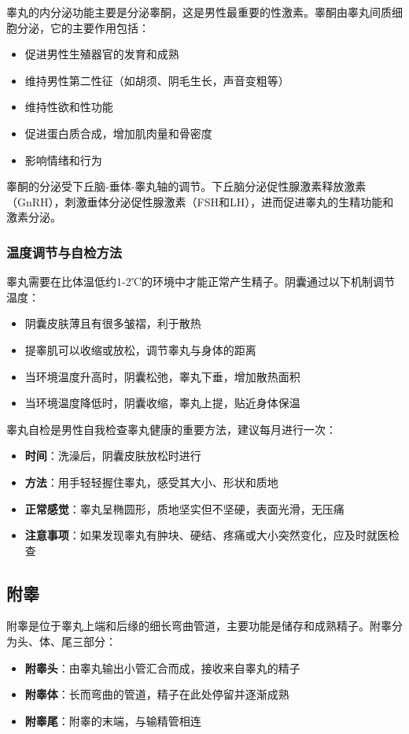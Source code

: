 \documentclass[12pt,a4paper,twoside]{ctexbook}
\begin{document}
睾丸的内分泌功能主要是分泌睾酮，这是男性最重要的性激素。睾酮由睾丸间质细胞分泌，它的主要作用包括：
\begin{itemize}
    \item 促进男性生殖器官的发育和成熟
    \item 维持男性第二性征（如胡须、阴毛生长，声音变粗等）
    \item 维持性欲和性功能
    \item 促进蛋白质合成，增加肌肉量和骨密度
    \item 影响情绪和行为
\end{itemize}

睾酮的分泌受下丘脑-垂体-睾丸轴的调节。下丘脑分泌促性腺激素释放激素（GnRH），刺激垂体分泌促性腺激素（FSH和LH），进而促进睾丸的生精功能和激素分泌。

\subsubsection{温度调节与自检方法}

睾丸需要在比体温低约1-2℃的环境中才能正常产生精子。阴囊通过以下机制调节温度：
\begin{itemize}
    \item 阴囊皮肤薄且有很多皱褶，利于散热
    \item 提睾肌可以收缩或放松，调节睾丸与身体的距离
    \item 当环境温度升高时，阴囊松弛，睾丸下垂，增加散热面积
    \item 当环境温度降低时，阴囊收缩，睾丸上提，贴近身体保温
\end{itemize}

睾丸自检是男性自我检查睾丸健康的重要方法，建议每月进行一次：
\begin{itemize}
    \item \textbf{时间}：洗澡后，阴囊皮肤放松时进行
    \item \textbf{方法}：用手轻轻握住睾丸，感受其大小、形状和质地
    \item \textbf{正常感觉}：睾丸呈椭圆形，质地坚实但不坚硬，表面光滑，无压痛
    \item \textbf{注意事项}：如果发现睾丸有肿块、硬结、疼痛或大小突然变化，应及时就医检查
\end{itemize}

\subsection{附睾}

附睾是位于睾丸上端和后缘的细长弯曲管道，主要功能是储存和成熟精子。附睾分为头、体、尾三部分：
\begin{itemize}
    \item \textbf{附睾头}：由睾丸输出小管汇合而成，接收来自睾丸的精子
    \item \textbf{附睾体}：长而弯曲的管道，精子在此处停留并逐渐成熟
    \item \textbf{附睾尾}：附睾的末端，与输精管相连
\end{itemize}
\end{document}
